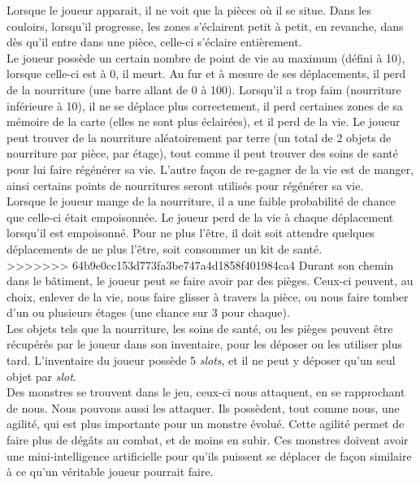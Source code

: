 \documentclass[11pt]{report}
\begin{document}
	Lorsque le joueur apparait, il ne voit que la pièces où il se situe. Dans les couloirs, lorsqu'il progresse, les zones s'éclairent petit à petit, en revanche, dans dès qu'il entre dans une pièce, celle-ci s'éclaire entièrement.\\
	Le joueur possède un certain nombre de point de vie au maximum (défini à 10), lorsque celle-ci est à 0, il meurt. Au fur et à mesure de ses déplacements, il perd de la nourriture (une barre allant de 0 à 100). Lorsqu'il a trop faim (nourriture inférieure à 10), il ne se déplace plus correctement, il perd certaines zones de sa mémoire de la carte (elles ne sont plus éclairées), et il perd de la vie. Le joueur peut trouver de la nourriture aléatoirement par terre (un total de 2 objets de nourriture par pièce, par étage), tout comme il peut trouver des soins de santé pour lui faire régénérer sa vie. L'autre façon de re-gagner de la vie est de manger, ainsi certains points de nourritures seront utilisés pour régénérer sa vie.\\
	Lorsque le joueur mange de la nourriture, il a une faible probabilité de chance que celle-ci était empoisonnée. Le joueur perd de la vie à chaque déplacement lorsqu'il est empoisonné. Pour ne plus l'être, il doit soit attendre quelques déplacements de ne plus l'être, soit consommer un kit de santé.\\
>>>>>>> 64b9e0cc153d773fa3be747a4d1858f401984ca4
	Durant son chemin dans le bâtiment, le joueur peut se faire avoir par des pièges. Ceux-ci peuvent, au choix, enlever de la vie, nous faire glisser à travers la pièce, ou nous faire tomber d'un ou plusieurs étages (une chance sur 3 pour chaque).\\
	Les objets tels que la nourriture, les soins de santé, ou les pièges peuvent être récupérés par le joueur dans son inventaire, pour les déposer ou les utiliser plus tard. L'inventaire du joueur possède 5 \emph{slots}, et il ne peut y déposer qu'un seul objet par \emph{slot}.\\
	Des monstres se trouvent dans le jeu, ceux-ci nous attaquent, en se rapprochant de nous. Nous pouvons aussi les attaquer. Ils possèdent, tout comme nous, une agilité, qui est plus importante pour un monstre évolué. Cette agilité permet de faire plus de dégâts au combat, et de moins en subir. Ces monstres doivent avoir une mini-intelligence artificielle pour qu'ils puissent se déplacer de façon similaire à ce qu'un véritable joueur pourrait faire.
	
	\vspace{12pt}
\end{document}
